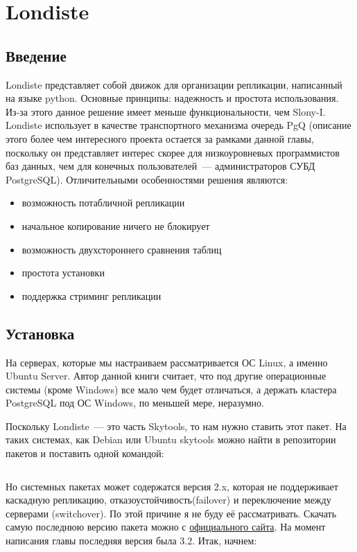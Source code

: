 \section{Londiste}
\label{sec:londiste}

\subsection{Введение}
Londiste представляет собой движок для организации репликации, написанный на языке python.
Основные принципы: надежность и простота использования. Из-за этого данное решение имеет меньше функциональности,
чем Slony-I. Londiste использует в качестве транспортного механизма очередь PgQ  (описание этого более чем интересного
проекта остается за рамками данной главы, поскольку он представляет интерес скорее для низкоуровневых программистов
баз данных, чем для конечных пользователей~--- администраторов СУБД PostgreSQL). Отличительными особенностями решения являются:
\begin{itemize}
\item возможность потабличной репликации
\item начальное копирование ничего не блокирует
\item возможность двухстороннего сравнения таблиц
\item простота установки
\item поддержка стриминг репликации
\end{itemize}


\subsection{Установка}
На серверах, которые мы настраиваем рассматривается ОС Linux, а именно Ubuntu Server.
Автор данной книги считает, что под другие операционные системы (кроме Windows) все мало чем будет отличаться,
а держать кластера PostgreSQL под ОС Windows, по меньшей мере, неразумно.

Поскольку Londiste~--- это часть Skytools, то нам нужно ставить этот пакет. На таких системах, как Debian или Ubuntu skytools
можно найти в репозитории пакетов и поставить одной командой:
\begin{lstlisting}[label=lst:londiste1,caption=Установка]
% sudo aptitude install skytools
\end{lstlisting}

Но системных пакетах может содержатся версия 2.x, которая не поддерживает каскадную репликацию, отказоустойчивость(failover) и переключение между серверами (switchover). По этой причине я не буду её рассматривать. Скачать самую последнюю версию пакета можно с \href{http://pgfoundry.org/projects/skytools}{официального сайта}.
На момент написания главы последняя версия была 3.2. Итак, начнем:

